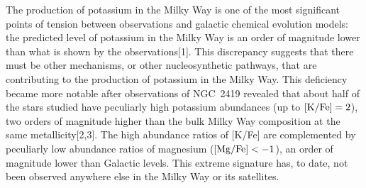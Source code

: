 \documentclass[12pt]{report}
\begin{document}
The production of potassium in the Milky Way is one of the most significant points of tension between observations and galactic chemical evolution models: the predicted level of potassium in the Milky Way is an order of magnitude lower than what is shown by the observations[1]. This discrepancy suggests that there must be other mechanisms, or other nucleosynthetic pathways, that are contributing to the production of potassium in the Milky Way. This deficiency became more notable after observations of NGC~2419 revealed that about half of the stars studied have peculiarly high potassium abundances (up to $[{\rm K/Fe}] = 2$), two orders of magnitude higher than the bulk Milky Way composition at the same metallicity[2,3]. The high abundance ratios of [K/Fe] are complemented by peculiarly low abundance ratios of magnesium ($[{\rm Mg/Fe}] < -1$), an order of magnitude lower than Galactic levels. This extreme signature has, to date, not been observed anywhere else in the Milky Way or its satellites.%









\end{document}
